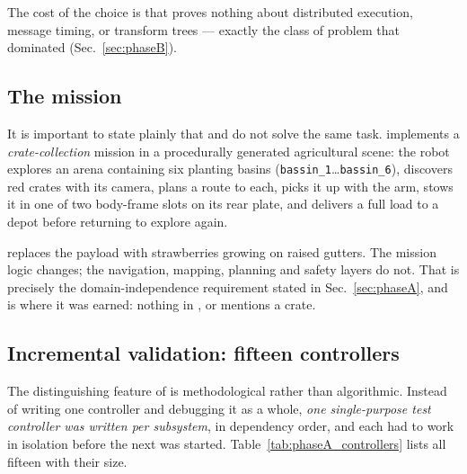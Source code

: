 The cost of the choice is that \phaseA{} proves nothing about
distributed execution, message timing, or transform trees --- exactly
the class of problem that dominated \phaseB{}
(Sec.~\ref{sec:phaseB}).

\subsection{The \phaseA{} mission}

It is important to state plainly that \phaseA{} and \phaseB{} do not
solve the same task. \phaseA{} implements a \emph{crate-collection}
mission in a procedurally generated agricultural scene: the robot
explores an arena containing six planting basins
(\texttt{bassin\_1}\dots\texttt{bassin\_6}), discovers red crates with
its camera, plans a route to each, picks it up with the arm, stows it in
one of two body-frame slots on its rear plate, and delivers a full load
to a depot before returning to explore again.

\phaseB{} replaces the payload with strawberries growing on raised
gutters. The mission logic changes; the navigation, mapping, planning
and safety layers do not. That is precisely the domain-independence
requirement stated in Sec.~\ref{sec:phaseA}, and \phaseA{} is where it
was earned: nothing in , 
or  mentions a crate.

\subsection{Incremental validation: fifteen controllers}

The distinguishing feature of \phaseA{} is methodological rather than
algorithmic. Instead of writing one controller and debugging it as a
whole, \emph{one single-purpose test controller was written per
subsystem}, in dependency order, and each had to work in isolation
before the next was started. Table~\ref{tab:phaseA_controllers} lists
all fifteen with their size.

